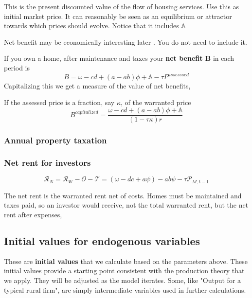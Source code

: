 This is the present discounted value of the flow of housing services.  Use this as initial market price.  It can reasonably be seen as an equilibrium or attractor towards which prices should  evolve.  Notice that it includes $\mathbb{A}$

{\color{red}
Net benefit may be economically interesting later . You do not need to include it. 

If you own a home, after maintenance and taxes your \textbf{net benefit B} in each period is 
\[B= \omega-cd +(a-ab)\phi +\mathbb{A} - \tau P^{assesssed}\]
Capitalizing this we get a measure of the value of net benefits, 

If the assessed price is a fraction, say $\kappa$,  of the warranted price
\[B^{capitalized}=\frac{\omega-cd +(a-ab)\phi + \mathbb{A}}{(1- \tau\kappa)r}\]
}
\subsubsection{Annual property taxation}

\subsubsection{Net rent for investors} {\color{green}}
\[\mathcal{R}_N = \mathcal{R}_W - \mathcal{O} - \mathcal{T}= (\omega - {dc} + a\psi )- a b \psi - \tau  \mathcal{P}_{M, t-1}\]

The \gls{net rent} is the warranted rent net of costs. Homes must be maintained and taxes paid, so an investor would receive, not the total warranted rent, but the net rent after expenses,

\subsection{Initial values for endogenous variables} \label{sec-init-value-list}

These are \textbf{initial values} that we calculate based on the parameters above. These initial values provide  a starting point consistent with the production theory that we apply. They will be adjusted as the model iterates.  Some, like "Output for a typical rural firm", are simply intermediate variables used in further calculations.%



